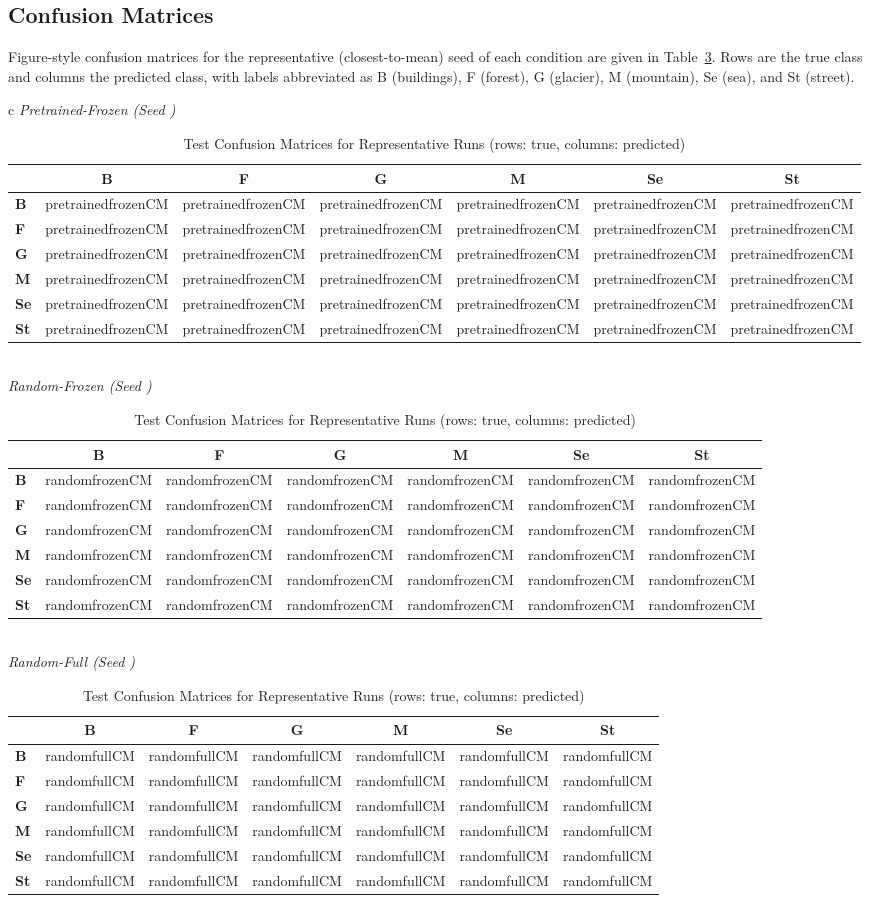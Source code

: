 \documentclass[conference]{IEEEtran}
\begin{document}
\subsection{Confusion Matrices}
Figure-style confusion matrices for the representative (closest-to-mean) seed of each condition are given in Table~\ref{tab:cm}. Rows are the true class and columns the predicted class, with labels abbreviated as B (buildings), F (forest), G (glacier), M (mountain), Se (sea), and St (street).

\newcommand{\cmhead}{ & \textbf{B} & \textbf{F} & \textbf{G} & \textbf{M} & \textbf{Se} & \textbf{St} \\ \hline}
\newcommand{\drawcm}[1]{%
\begin{tabular}{l|cccccc}
\cmhead
\textbf{B}  & \csname #1CM\endcsname{0}{0} & \csname #1CM\endcsname{0}{1} & \csname #1CM\endcsname{0}{2} & \csname #1CM\endcsname{0}{3} & \csname #1CM\endcsname{0}{4} & \csname #1CM\endcsname{0}{5} \\
\textbf{F}  & \csname #1CM\endcsname{1}{0} & \csname #1CM\endcsname{1}{1} & \csname #1CM\endcsname{1}{2} & \csname #1CM\endcsname{1}{3} & \csname #1CM\endcsname{1}{4} & \csname #1CM\endcsname{1}{5} \\
\textbf{G}  & \csname #1CM\endcsname{2}{0} & \csname #1CM\endcsname{2}{1} & \csname #1CM\endcsname{2}{2} & \csname #1CM\endcsname{2}{3} & \csname #1CM\endcsname{2}{4} & \csname #1CM\endcsname{2}{5} \\
\textbf{M}  & \csname #1CM\endcsname{3}{0} & \csname #1CM\endcsname{3}{1} & \csname #1CM\endcsname{3}{2} & \csname #1CM\endcsname{3}{3} & \csname #1CM\endcsname{3}{4} & \csname #1CM\endcsname{3}{5} \\
\textbf{Se} & \csname #1CM\endcsname{4}{0} & \csname #1CM\endcsname{4}{1} & \csname #1CM\endcsname{4}{2} & \csname #1CM\endcsname{4}{3} & \csname #1CM\endcsname{4}{4} & \csname #1CM\endcsname{4}{5} \\
\textbf{St} & \csname #1CM\endcsname{5}{0} & \csname #1CM\endcsname{5}{1} & \csname #1CM\endcsname{5}{2} & \csname #1CM\endcsname{5}{3} & \csname #1CM\endcsname{5}{4} & \csname #1CM\endcsname{5}{5} \\
\end{tabular}}

\begin{table}[h]
\centering
\caption{Test Confusion Matrices for Representative Runs (rows: true, columns: predicted)}
\label{tab:cm}
\setlength{\tabcolsep}{3pt}
\small
\begin{tabular}{c}
\textit{Pretrained-Frozen (Seed \pretrainedfrozenClosestSeed)} \\[2pt]
\drawcm{pretrainedfrozen} \\[6pt]
\textit{Random-Frozen (Seed \randomfrozenClosestSeed)} \\[2pt]
\drawcm{randomfrozen} \\[6pt]
\textit{Random-Full (Seed \randomfullClosestSeed)} \\[2pt]
\drawcm{randomfull} \\
\end{tabular}
\end{table}
\end{document}
